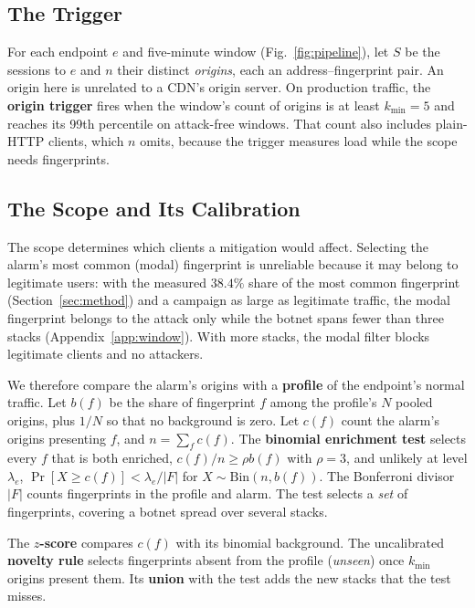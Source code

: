 \documentclass[conference,letterpaper,10pt]{IEEEtran}
\newcommand\1{\textit{(i)}}
\newcommand\2{\textit{(ii)}}
\newcommand\3{\textit{(iii)}}
\newcommand\4{\textit{(iv)}}
\newcommand\5{\textit{(v)}}
\newcommand\6{\textit{(vi)}}
\newcommand\7{\textit{(vii)}}
\newcommand\8{\textit{(viii)}}
\newcommand\9{\textit{(ix)}}
\begin{document}
\subsection{The Trigger}
\label{sec:rule}

For each endpoint $e$ and five-minute window (Fig.~\ref{fig:pipeline}), let $S$ be the sessions to $e$ and $n$ their distinct \textit{origins}, each an address--fingerprint pair. An origin here is unrelated to a CDN's origin server.
On production traffic, the \textbf{origin trigger} fires when the window's count of origins is at least $k_{\min}=5$ and reaches its 99th percentile on attack-free windows. That count also includes plain-HTTP clients, which $n$ omits, because the trigger measures load while the scope needs fingerprints.



\subsection{The Scope and Its Calibration}
\label{sec:evidence}

The scope determines which clients a mitigation would
affect. Selecting the alarm's most common (modal)
fingerprint is unreliable because it may belong to
legitimate users: with the measured $38.4\%$ share of the
most common fingerprint (Section~\ref{sec:method}) and a
campaign as large as legitimate traffic, the modal fingerprint
belongs to the attack only while the botnet spans fewer than
three stacks (Appendix~\ref{app:window}). With more stacks,
the modal filter blocks legitimate clients and no attackers.

We therefore compare the alarm's origins with a \textbf{profile} of
the endpoint's normal traffic.
Let $b(f)$ be the share of fingerprint $f$ among the
profile's $N$ pooled origins, plus $1/N$
so that no background is zero. Let
$c(f)$ count the alarm's origins presenting $f$, and
$n=\sum_f c(f)$. The \textbf{binomial enrichment test}
selects every $f$ that is both enriched, $c(f)/n \geq \rho
b(f)$ with $\rho=3$, and unlikely at level $\lambda_e$,
$\Pr[X\geq c(f)]<\lambda_e/|F|$ for
$X\sim\mathrm{Bin}(n,b(f))$. The Bonferroni divisor
$|F|$ counts fingerprints in the profile and alarm.
The test selects a \textit{set} of fingerprints, covering a botnet spread over several stacks.

The \textbf{$z$-score} compares $c(f)$ with its
binomial background. The uncalibrated \textbf{novelty rule} selects fingerprints absent from the profile (\textit{unseen}) once $k_{\min}$ origins present them. Its \textbf{union} with the test adds the new stacks that the test misses.
\end{document}
